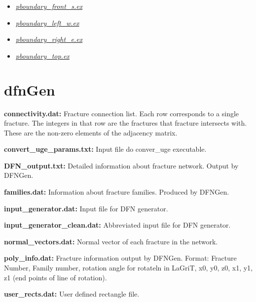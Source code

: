 \documentclass[letterpaper,10pt,english]{sphinxmanual}
\begin{document}
\begin{itemize}
\item {} 
{\hyperref[output:pboundary-front-s-ex]{\emph{pboundary\_front\_s.ex}}}

\item {} 
{\hyperref[output:pboundary-left-w-ex]{\emph{pboundary\_left\_w.ex}}}

\item {} 
{\hyperref[output:pboundary-right-e-ex]{\emph{pboundary\_right\_e.ex}}}

\item {} 
{\hyperref[output:pboundary-top-ex]{\emph{pboundary\_top.ex}}}

\end{itemize}


\section{dfnGen}
\label{output:id1}
\textbf{connectivity.dat:}
\label{output:connectivity-dat}
Fracture connection list. Each row corresponds to a single fracture. The integers in that row are the fractures that fracture intersects with. These are the non-zero elements of the adjacency matrix.

\textbf{convert\_uge\_params.txt:}
\label{output:convert-uge-params-txt}
Input file do conver\_uge executable.

\textbf{DFN\_output.txt:}
\label{output:dfn-output-txt}
Detailed information about fracture network. Output by DFNGen.

\textbf{families.dat:}
\label{output:families-dat}
Information about fracture families. Produced by DFNGen.

\textbf{input\_generator.dat:}
\label{output:input-generator-dat}
Input file for DFN generator.

\textbf{input\_generator\_clean.dat:}
\label{output:input-generator-clean-dat}
Abbreviated input file for DFN generator.

\textbf{normal\_vectors.dat:}
\label{output:normal-vectors-dat}
Normal vector of each fracture in the network.

\textbf{poly\_info.dat:}
\label{output:poly-info-dat}
Fracture information output by DFNGen. Format: Fracture Number, Family number, rotation angle for rotateln in LaGriT, x0, y0, z0, x1, y1, z1 (end points of line of rotation).

\textbf{user\_rects.dat:}
\label{output:user-rects-dat}
User defined rectangle file.
\end{document}
